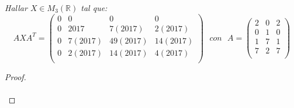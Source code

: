 \documentclass[11pt,letterpaper]{article}
\newcommand{\R}{\mathbb{R}}
\begin{document}
\begin{tcolorbox}[title=Problema 5, colframe=G, coltitle=B, fonttitle=\bfseries]
\textit{Hallar $X\in M_{3}(\R)$ tal que:
\begin{equation*}
  AXA^{T}=\begin{pmatrix}
    0 & 0 & 0 & 0\\
    0 & 2017 & 7(2017) & 2(2017)\\
    0 & 7(2017) & 49(2017) & 14(2017)\\
    0 & 2(2017) & 14(2017) & 4(2017)\\
  \end{pmatrix}\,\,\,\,con\,\,\,\,A=\begin{pmatrix}
    2 & 0 & 2\\
    0 & 1 & 0 \\
    1 & 7 & 1 \\
    7 & 2 & 7\\
\end{pmatrix}
\end{equation*}}  
\end{tcolorbox}
\begin{proof}\,\\
    \,\\
\end{proof}
\end{document}

